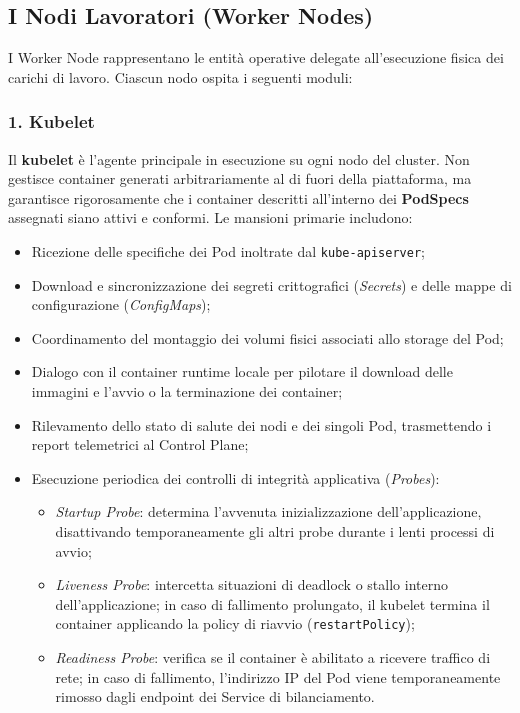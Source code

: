 \documentclass[11pt, a4paper]{article}
\begin{document}
\subsection{I Nodi Lavoratori (Worker Nodes)}
I Worker Node rappresentano le entità operative delegate all'esecuzione fisica dei carichi di lavoro. Ciascun nodo ospita i seguenti moduli:


\subsubsection{1. Kubelet}
Il \textbf{kubelet} è l'agente principale in esecuzione su ogni nodo del cluster. Non gestisce container generati arbitrariamente al di fuori della piattaforma, ma garantisce rigorosamente che i container descritti all'interno dei \textbf{PodSpecs} assegnati siano attivi e conformi. Le mansioni primarie includono:
\begin{itemize}[noitemsep]
    \item Ricezione delle specifiche dei Pod inoltrate dal \texttt{kube-apiserver};
    \item Download e sincronizzazione dei segreti crittografici (\emph{Secrets}) e delle mappe di configurazione (\emph{ConfigMaps});
    \item Coordinamento del montaggio dei volumi fisici associati allo storage del Pod;
    \item Dialogo con il container runtime locale per pilotare il download delle immagini e l'avvio o la terminazione dei container;
    \item Rilevamento dello stato di salute dei nodi e dei singoli Pod, trasmettendo i report telemetrici al Control Plane;
    \item Esecuzione periodica dei controlli di integrità applicativa (\emph{Probes}):
    \begin{itemize}[noitemsep]
        \item \emph{Startup Probe}: determina l'avvenuta inizializzazione dell'applicazione, disattivando temporaneamente gli altri probe durante i lenti processi di avvio;
        \item \emph{Liveness Probe}: intercetta situazioni di deadlock o stallo interno dell'applicazione; in caso di fallimento prolungato, il kubelet termina il container applicando la policy di riavvio (\texttt{restartPolicy});
        \item \emph{Readiness Probe}: verifica se il container è abilitato a ricevere traffico di rete; in caso di fallimento, l'indirizzo IP del Pod viene temporaneamente rimosso dagli endpoint dei Service di bilanciamento.
    \end{itemize}
\end{itemize}
\end{document}
